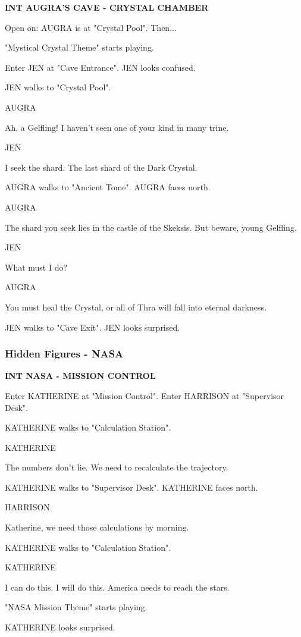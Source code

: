 \documentclass[11pt,letterpaper,oldstylefigures]{memoir}
\newcommand{\slugline}[1]{\nobreak\textbf{\MakeUppercase{#1}}\par\nobreak\vspace{1\baselineskip}}
\newcommand{\speaker}[1]{\nobreak\hspace*{0.333\textwidth}\MakeUppercase{#1}\par\nobreak\vspace{0.5\baselineskip}}
\newcommand{\dialogue}[1]{\nobreak\hspace*{0.25\textwidth}\begin{minipage}{0.5\textwidth}#1\end{minipage}\par\vspace{1\baselineskip}}
\newcommand{\stagedir}[1]{#1\par\vspace{1\baselineskip}}
\newenvironment{FountainExample}
  {\begingroup
  \ttfamily\small
   \setlength{\parindent}{0pt}
  \setlength{\parskip}{0.5em}
  \allowdisplaybreaks
  \setlength{\displaywidowpenalty}{0}
  \setlength{\widowpenalty}{0}
  \setlength{\clubpenalty}{0}
  \setlength{\interlinepenalty}{0}
}
  {\endgroup}
\newcommand{\paragraphbreak}{\vspace{0.5em}}
\begin{document}
\begin{FountainExample}
\slugline{INT AUGRA'S CAVE - CRYSTAL CHAMBER}

\stagedir{Open on: AUGRA is at "Crystal Pool". Then...}
\stagedir{"Mystical Crystal Theme" starts playing.}
\stagedir{Enter JEN at "Cave Entrance". JEN looks confused.}

\stagedir{JEN walks to "Crystal Pool".}

\speaker{AUGRA}
\dialogue{Ah, a Gelfling! I haven't seen one of your kind in many trine.}

\speaker{JEN}
\dialogue{I seek the shard. The last shard of the Dark Crystal.}

\stagedir{AUGRA walks to "Ancient Tome". AUGRA faces north.}

\speaker{AUGRA}
\dialogue{The shard you seek lies in the castle of the Skeksis. But beware, young Gelfling.}

\speaker{JEN}
\dialogue{What must I do?}

\speaker{AUGRA}
\dialogue{You must heal the Crystal, or all of Thra will fall into eternal darkness.}

\stagedir{JEN walks to "Cave Exit". JEN looks surprised.}
\end{FountainExample}

\paragraphbreak

\subsubsection*{Hidden Figures - NASA}
\label{ex:hidden-figures-nasa}

\begin{FountainExample}
\slugline{INT NASA - MISSION CONTROL}

\stagedir{Enter KATHERINE at "Mission Control". Enter HARRISON at "Supervisor Desk".}

\stagedir{KATHERINE walks to "Calculation Station".}

\speaker{KATHERINE}
\dialogue{The numbers don't lie. We need to recalculate the trajectory.}

\stagedir{KATHERINE walks to "Supervisor Desk". KATHERINE faces north.}

\speaker{HARRISON}
\dialogue{Katherine, we need those calculations by morning.}

\stagedir{KATHERINE walks to "Calculation Station".}

\speaker{KATHERINE}
\dialogue{I can do this. I will do this. America needs to reach the stars.}

\stagedir{"NASA Mission Theme" starts playing.}

\stagedir{KATHERINE looks surprised.}
\end{FountainExample}
\end{document}
